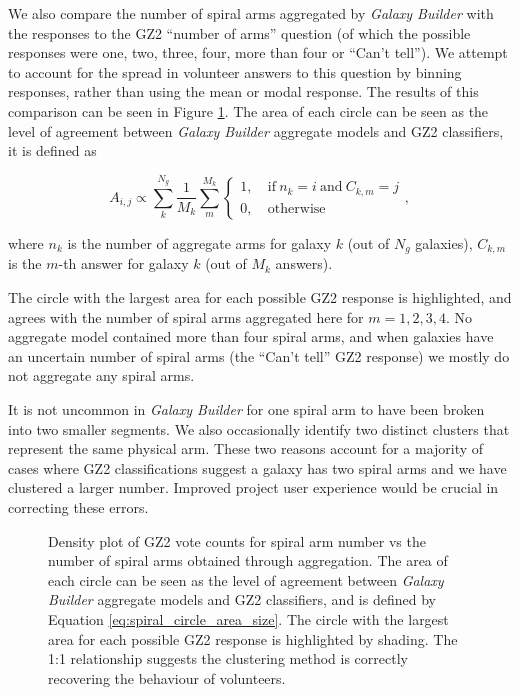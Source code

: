 \documentclass[trackchanges]{aastex63}
\begin{document}
We also compare the number of spiral arms aggregated by \textit{Galaxy Builder} with the responses to the GZ2 ``number of arms'' question (of which the possible responses were one, two, three, four, more than four or ``Can't tell''). We attempt to account for the spread in volunteer answers to this question by binning responses, rather than using the mean or modal response. The results of this comparison can be seen in Figure \ref{fig:n_spirals_comparison}. The area of each circle can be seen as the level of agreement between \textit{Galaxy Builder} aggregate models and GZ2 classifiers, it is defined as

\begin{equation}
  \label{eq:spiral_circle_area_size}
  A_{i, j} \propto \sum_{k}^{N_g}\frac{1}{M_k}\sum_{m}^{M_k}
  \begin{cases}
    1,&\ \mathrm{if}\ n_k = i\ \mathrm{and}\ C_{k, m} = j\\
    0,&\ \mathrm{otherwise}
  \end{cases},
\end{equation}

where $n_k$ is the number of aggregate arms for galaxy $k$ (out of $N_g$ galaxies), $C_{k, m}$ is the $m$-th answer for galaxy $k$ (out of $M_k$ answers).

The circle with the largest area for each possible GZ2 response is highlighted, and agrees with the number of spiral arms aggregated here for $m=1, 2, 3, 4$. No aggregate model contained more than four spiral arms, and when galaxies have an uncertain number of spiral arms (the ``Can't tell'' GZ2 response) we mostly do not aggregate any spiral arms.

It is not uncommon in \textit{Galaxy Builder} for one spiral arm to have been broken into two smaller segments. We also occasionally identify two distinct clusters that represent the same physical arm. These two reasons account for a majority of cases where GZ2 classifications suggest a galaxy has two spiral arms and we have clustered a larger number. Improved project user experience would be crucial in correcting these errors.

\begin{figure}
  \caption{Density plot of GZ2 vote counts for spiral arm number vs the number of spiral arms obtained through aggregation. The area of each circle can be seen as the level of agreement between \textit{Galaxy Builder} aggregate models and GZ2 classifiers, and is defined by Equation \ref{eq:spiral_circle_area_size}. The circle with the largest area for each possible GZ2 response is highlighted by shading. The 1:1 relationship suggests the clustering method is correctly recovering the behaviour of volunteers.}
  \label{fig:n_spirals_comparison}
\end{figure}
\end{document}
